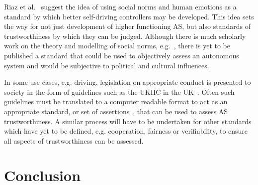 Riaz et al.~\cite{Riaz2018} suggest the idea of using social norms and human emotions as a standard by which better self-driving controllers may be developed. This idea sets the way for not just development of higher functioning AS, but also standards of trustworthiness by which they can be judged. Although there is much scholarly work on the theory and modelling of social norms, e.g.~\cite{hechter2001social}, there is yet to be published a standard that could be used to objectively assess an autonomous system and would be subjective to political and cultural influences. 

In some use cases, e.g. driving, legislation on appropriate conduct is presented to society in the form of guidelines such as the UKHC in the UK~\cite{highwayCode}. Often such guidelines must be translated to a computer readable format to act as an appropriate standard, or set of assertions~\cite{harper2021safety}, that can be used to assess AS trustworthiness. A similar process will have to be undertaken for other standards which have yet to be defined, e.g. cooperation, fairness or verifiability, to ensure all aspects of trustworthiness can be assessed. 


%






\section{Conclusion} \label{sec:conc}



